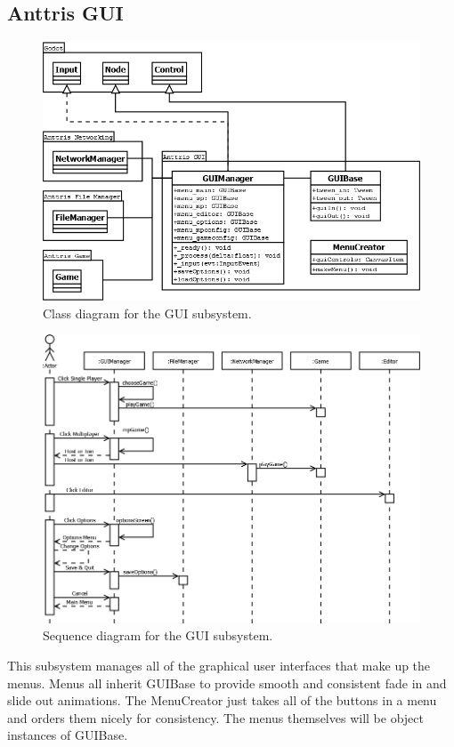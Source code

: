 \documentclass[12pt]{article}
\begin{document}
\subsection{Anttris GUI} %
    \begin{figure}[H]
        \centering
        \includegraphics[width=6in]{Anttris_GUIClass.png}
        \caption{Class diagram for the GUI subsystem.}
    \end{figure}
    \begin{figure}[H]
        \centering
        \includegraphics[width=6in]{Anttris_GUISequence.png}
        \caption{Sequence diagram for the GUI subsystem.}
    \end{figure}

This subsystem manages all of the graphical user interfaces that make up the menus. Menus all inherit GUIBase to provide smooth and consistent fade in and slide out animations. The MenuCreator just takes all of the buttons in a menu and orders them nicely for consistency. The menus themselves will be object instances of GUIBase.
\end{document}
